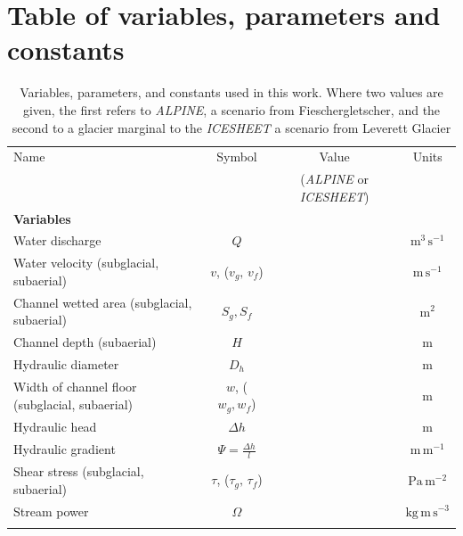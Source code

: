 \documentclass[draft]{agujournal2019}
\newcommand{\alpine}{\textit{ALPINE}}
\newcommand{\icesheet}{\textit{ICESHEET}}
\begin{document}


\newpage

\appendix

\section{Table of variables, parameters and constants}
\begin{table}[h]
  \centering
  \caption{Variables, parameters, and constants used in this work.
    Where two values are given, the first refers to  \alpine{}, a scenario from Fieschergletscher, and the second to a glacier marginal to the \icesheet{} a scenario from Leverett Glacier}
  \small %
  \begin{tabular}{ l  c  c c }
    Name &Symbol&  Value&Units \\
    && (\alpine{} or \icesheet{})\\
    \hline
    \textbf{Variables}  & & & \\
    Water discharge  & $Q$& & $\mathrm{m^{3}\,s^{-1}}$ \\
    Water velocity (subglacial, subaerial)  & $v$, ($v_g,\,v_{f}$)& & $\mathrm{m\,s^{-1}}$ \\
    Channel wetted area (subglacial, subaerial) &  $S_g, S_f$& & $\mathrm{m^2}$     \\
    Channel depth (subaerial) & $H$&& $\mathrm{m}$\\
    Hydraulic diameter &$D_h$&&$\mathrm{m}$\\
    Width of channel floor (subglacial, subaerial) & $w$, ($w_g,w_f$)&  & $\mathrm{m}$     \\
    Hydraulic head &$\Delta h$&& $\mathrm{m}$\\
    Hydraulic gradient &$\Psi=\frac{\Delta h}{l}$&& $\mathrm{m\, m^{-1}}$\\
    Shear stress (subglacial, subaerial) & $\tau$, ($\tau_g,\,\tau_f$) && $\mathrm{Pa \, m^{-2}}$ \\
    Stream power & $\Omega$ && $\mathrm{ kg \, m\, s^{-3}}$ \\

         &&&\\


\end{tabular}
\end{table}
\end{document}
